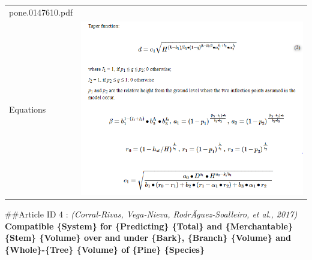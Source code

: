 \documentclass[]{article}
\begin{document}
\begin{longtable}[]{@{}ll@{}}
\begin{minipage}[t]{0.73\columnwidth}
pone.0147610.pdf\strut
\end{minipage}\tabularnewline
\begin{minipage}[t]{0.21\columnwidth}\raggedright
Equations\strut
\end{minipage} & \begin{minipage}[t]{0.73\columnwidth}\raggedright
\includegraphics{Equations/2016TangEtAl.png}\strut
\end{minipage}\tabularnewline
\bottomrule
\end{longtable}

\#\#Article ID 4 : \emph{(Corral-Rivas, Vega-Nieva,
RodrÃ­guez-Soalleiro, et al., 2017)} \textbf{Compatible \{System\} for
\{Predicting\} \{Total\} and \{Merchantable\} \{Stem\} \{Volume\} over
and under \{Bark\}, \{Branch\} \{Volume\} and \{Whole\}-\{Tree\}
\{Volume\} of \{Pine\} \{Species\}}
\end{document}
